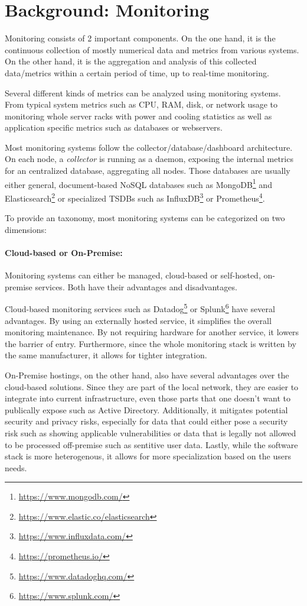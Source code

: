 \section{Background: Monitoring}
Monitoring consists of 2 important components. On the one hand, it is the continuous 
collection of mostly numerical data and metrics from various systems. On the other hand, it 
is the aggregation and analysis of this collected data/metrics within a certain period of 
time, up to real-time monitoring.

Several different kinds of metrics can be analyzed using monitoring systems. From typical
system metrics such as CPU, RAM, disk, or network usage to monitoring whole server racks
with power and cooling statistics as well as application specific metrics such as databases
or webservers.

Most monitoring systems follow the collector/database/dashboard architecture. On each node,
a \emph{collector} is running as a daemon, exposing the internal metrics for an centralized
database, aggregating all nodes. Those databases are usually either general, document-based
NoSQL databases such as MongoDB\footnote{\url{https://www.mongodb.com/}} and 
Elasticsearch\footnote{\url{https://www.elastic.co/elasticsearch}} or specialized \acp{TSDB}
such as InfluxDB\footnote{\url{https://www.influxdata.com/}} or Prometheus\footnote{
\url{https://prometheus.io/}}.

To provide an taxonomy, most monitoring systems can be categorized on two dimensions:

\paragraph{Cloud-based or On-Premise:} Monitoring systems can either be managed, cloud-based 
or self-hosted, on-premise services. Both have their advantages and disadvantages.

Cloud-based monitoring services such as Datadog\footnote{\url{https://www.datadoghq.com/}}
or Splunk\footnote{\url{https://www.splunk.com/}} have several advantages. By using an 
externally hosted service, it simplifies the overall monitoring maintenance. By not requiring
hardware for another service, it lowers the barrier of entry. Furthermore, since the whole
monitoring stack is written by the same manufacturer, it allows for tighter integration.

On-Premise hostings, on the other hand, also have several advantages over the cloud-based 
solutions. Since they are part of the local network, they are easier to integrate into current
infrastructure, even those parts that one doesn't want to publically expose such as Active 
Directory. Additionally, it mitigates potential security and privacy risks, especially for data
that could either pose a security risk such as showing applicable vulnerabilities or data that is
legally not allowed to be processed off-premise such as sentitive user data. Lastly, while the 
software stack is more heterogenous, it allows for more specialization based on the users needs.

